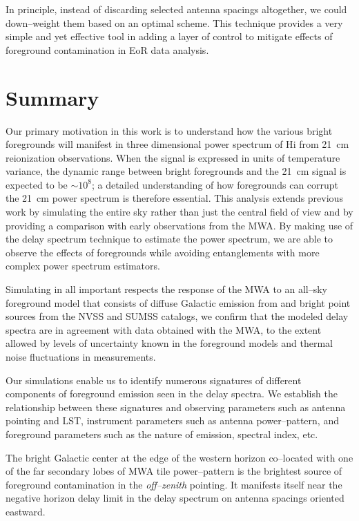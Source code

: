 \documentclass[preprint2,iop,numberedappendix]{emulateapj}
\begin{document}
In principle, instead of discarding selected antenna spacings altogether, we could down--weight them based on an optimal scheme. This technique provides a very simple and yet effective tool in adding a layer of control to mitigate effects of foreground contamination in EoR data analysis. %

\section{Summary}\label{sec:summary}

Our primary motivation in this work is to understand how the various bright foregrounds will manifest in three dimensional power spectrum of H{\sc i} from 21~cm reionization observations. When the signal is expressed in units of temperature variance, the dynamic range between bright foregrounds and the 21~cm signal is expected to be $\sim 10^8$; a detailed understanding of how foregrounds can corrupt the 21~cm power spectrum is therefore essential. This analysis extends previous work by simulating the entire sky rather than just the central field of view and by providing a comparison with early observations from the MWA. By making use of the delay spectrum technique to estimate the power spectrum, we are able to observe the effects of foregrounds while avoiding entanglements with more complex power spectrum estimators.  

Simulating in all important respects the response of the MWA to an all--sky foreground model that consists of diffuse Galactic emission from \citet{deo08} and bright point sources from the NVSS and SUMSS catalogs, we confirm that the modeled delay spectra are in agreement with data obtained with the MWA, to the extent allowed by levels of uncertainty known in the foreground models and thermal noise fluctuations in measurements. 

Our simulations enable us to identify numerous signatures of different components of foreground emission seen in the delay spectra. We establish the relationship between these signatures and observing parameters such as antenna pointing and LST, instrument parameters such as antenna power--pattern, and foreground parameters such as the nature of emission, spectral index, etc. 

The bright Galactic center at the edge of the western horizon co--located with one of the far secondary lobes of MWA tile power--pattern is the brightest source of foreground contamination in the {\it off--zenith} pointing. It manifests itself near the negative horizon delay limit in the delay spectrum on antenna spacings oriented eastward. 
\end{document}
